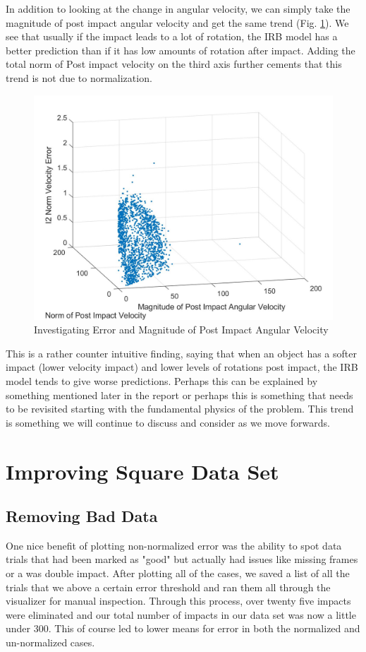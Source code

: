 \documentclass{article}
\begin{document}
\noindent In addition to looking at the change in angular velocity, we can simply take the magnitude of post impact angular velocity and get the same trend (Fig. \ref{fig:3DPlot}). We see that usually if the impact leads to a lot of rotation, the IRB model has a better prediction than if it has low amounts of rotation after impact. Adding the total norm of Post impact velocity on the third axis further cements that this trend is not due to normalization. \\

\begin{figure}[h!]
    \centering
    \includegraphics[scale = 0.25]{3DPlot.jpg}
    \caption{Investigating Error and Magnitude of Post Impact Angular Velocity}
    \label{fig:3DPlot}
\end{figure}

\noindent This is a rather counter intuitive finding, saying that when an object has a softer impact (lower velocity impact) and lower levels of rotations post impact, the IRB model tends to give worse predictions. Perhaps this can be explained by something mentioned later in the report or perhaps this is something that needs to be revisited starting with the fundamental physics of the problem. This trend is something we will continue to discuss and consider as we move forwards.

\newpage
\section{Improving Square Data Set}

\subsection{Removing Bad Data}
One nice benefit of plotting non-normalized error was the ability to spot data trials that had been marked as "good" but actually had issues like missing frames or a was double impact. After plotting all of the cases, we saved a list of all the trials that we above a certain error threshold and ran them all through the visualizer for manual inspection. Through this process, over twenty five impacts were eliminated and our total number of impacts in our data set was now a little under 300. This of course led to lower means for error in both the normalized and un-normalized cases.  
\end{document}
